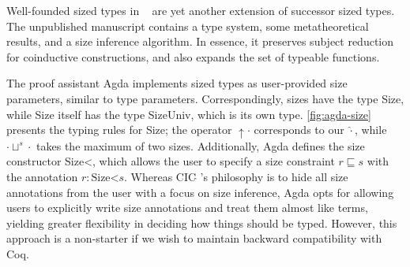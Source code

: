 Well-founded sized types in \CIChatsub~\citep{wellfounded} are yet another extension of successor sized types.
The unpublished manuscript contains a type system, some metatheoretical results, and a size inference algorithm.
In essence, it preserves subject reduction for coinductive constructions, and also expands the set of typeable functions.



The proof assistant Agda implements sized types as user-provided size parameters, similar to type parameters.
Correspondingly, sizes have the type Size, while Size itself has the type SizeUniv, which is its own type. \autoref{fig:agda-size} presents the typing rules for Size; the operator $\uparrow \cdot$ corresponds to our $\hat{\cdot}$, while $\cdot \sqcup^s \cdot$ takes the maximum of two sizes.
Additionally, Agda defines the size constructor Size<, which allows the user to specify a size constraint $r \sqsubseteq s$ with the annotation $r: \text{Size<} s$.
Whereas CIC$\widehat{~}\,$'s philosophy is to hide all size annotations from the user with a focus on size inference, Agda opts for allowing users to explicitly write size annotations and treat them almost like terms, yielding greater flexibility in deciding how things should be typed.
However, this approach is a non-starter if we wish to maintain backward compatibility with Coq.
